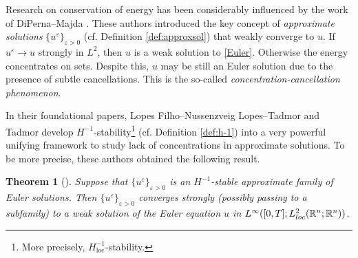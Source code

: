 \documentclass[11pt, a4paper,leqno]{amsart}
\newtheorem{theorem}{Theorem}
\theoremstyle{plain}
\numberwithin{equation}{section}
\theoremstyle{definition}
\theoremstyle{remark}
\begin{document}
Research on conservation of energy has been considerably influenced by the work of
DiPerna--Majda \cite{DiPernaMajda, DiPernaMajda1*, DiPernaMajda2}. These authors %
introduced the key concept of \emph{approximate solutions} $\{u^\varepsilon\}_{\varepsilon > 0}$ (cf. Definition \ref{def:approxsol}) that weakly converge to $u$. If $u^\varepsilon \to u$ strongly in $L^2$, then $u$ is a weak solution to  \eqref{Euler}. Otherwise the energy concentrates on sets.  Despite this, $u$ may be still an Euler solution due to the presence of subtle cancellations. This is the so-called \emph{concentration-cancellation phenomenon}. 


















In their foundational papers, Lopes Filho--Nussenzveig Lopes--Tadmor
\cite{LNT} and Tadmor \cite{Tadmor} develop $H^{-1}$-stability\footnote{More precisely,  $H^{-1}_{\text{loc}}$-stability.} (cf. Definition \ref{def:h-1}) into a
very powerful unifying framework to study lack of concentrations in approximate solutions. To be more precise, %
these authors obtained the following result.    


\begin{theorem}
[\cite{LNT}]\label{teoh-1} Suppose that $\{u^{\varepsilon}\}_{\varepsilon>0}$
is an $H^{-1}$-stable approximate family of Euler solutions. Then $\{u^{\varepsilon}\}_{\varepsilon>0}$  converges strongly (possibly passing to a subfamily)
to a weak solution of the Euler equation $u$ in $L^{\infty
}([0,T];L_{\emph{loc}}^{2}(\mathbb{R}^{n};\mathbb{R}^{n}))$.
\end{theorem}
\end{document}
